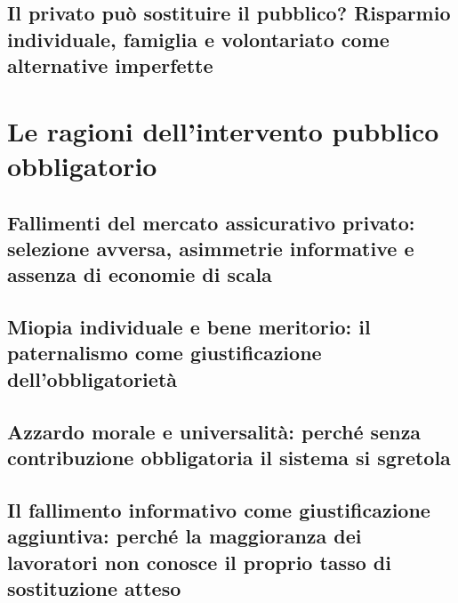    \subsection{Il privato può sostituire il pubblico?
                Risparmio individuale, famiglia e volontariato
                come alternative imperfette}

\section{Le ragioni dell'intervento pubblico obbligatorio}

    \subsection{Fallimenti del mercato assicurativo privato:
                selezione avversa, asimmetrie informative
                e assenza di economie di scala}
    \subsection{Miopia individuale e bene meritorio:
                il paternalismo come giustificazione
                dell'obbligatorietà}
    \subsection{Azzardo morale e universalità:
                perché senza contribuzione obbligatoria
                il sistema si sgretola}
    \subsection{Il fallimento informativo come giustificazione
                aggiuntiva: perché la maggioranza dei lavoratori
                non conosce il proprio tasso di sostituzione atteso}

